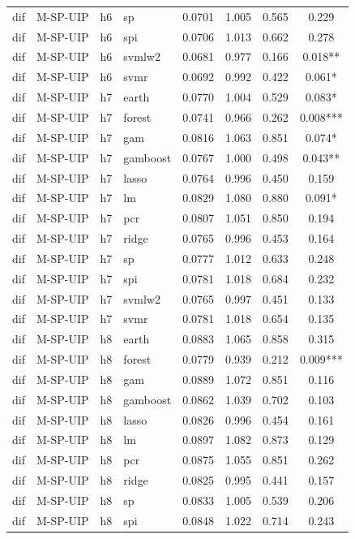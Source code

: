 \begin{ThreePartTable}
\begin{longtable}[t]{llclcccc}
dif & M-SP-UIP & h6 & sp & 0.0701 & 1.005 & 0.565 & 0.229\\
dif & M-SP-UIP & h6 & spi & 0.0706 & 1.013 & 0.662 & 0.278\\
dif & M-SP-UIP & h6 & svmlw2 & 0.0681 & 0.977 & 0.166 & 0.018**\\
dif & M-SP-UIP & h6 & svmr & 0.0692 & 0.992 & 0.422 & 0.061*\\
\addlinespace
dif & M-SP-UIP & h7 & earth & 0.0770 & 1.004 & 0.529 & 0.083*\\
dif & M-SP-UIP & h7 & forest & 0.0741 & 0.966 & 0.262 & 0.008***\\
dif & M-SP-UIP & h7 & gam & 0.0816 & 1.063 & 0.851 & 0.074*\\
dif & M-SP-UIP & h7 & gamboost & 0.0767 & 1.000 & 0.498 & 0.043**\\
dif & M-SP-UIP & h7 & lasso & 0.0764 & 0.996 & 0.450 & 0.159\\
dif & M-SP-UIP & h7 & lm & 0.0829 & 1.080 & 0.880 & 0.091*\\
dif & M-SP-UIP & h7 & pcr & 0.0807 & 1.051 & 0.850 & 0.194\\
dif & M-SP-UIP & h7 & ridge & 0.0765 & 0.996 & 0.453 & 0.164\\
dif & M-SP-UIP & h7 & sp & 0.0777 & 1.012 & 0.633 & 0.248\\
dif & M-SP-UIP & h7 & spi & 0.0781 & 1.018 & 0.684 & 0.232\\
dif & M-SP-UIP & h7 & svmlw2 & 0.0765 & 0.997 & 0.451 & 0.133\\
dif & M-SP-UIP & h7 & svmr & 0.0781 & 1.018 & 0.654 & 0.135\\
\addlinespace
dif & M-SP-UIP & h8 & earth & 0.0883 & 1.065 & 0.858 & 0.315\\
dif & M-SP-UIP & h8 & forest & 0.0779 & 0.939 & 0.212 & 0.009***\\
dif & M-SP-UIP & h8 & gam & 0.0889 & 1.072 & 0.851 & 0.116\\
dif & M-SP-UIP & h8 & gamboost & 0.0862 & 1.039 & 0.702 & 0.103\\
dif & M-SP-UIP & h8 & lasso & 0.0826 & 0.996 & 0.454 & 0.161\\
dif & M-SP-UIP & h8 & lm & 0.0897 & 1.082 & 0.873 & 0.129\\
dif & M-SP-UIP & h8 & pcr & 0.0875 & 1.055 & 0.851 & 0.262\\
dif & M-SP-UIP & h8 & ridge & 0.0825 & 0.995 & 0.441 & 0.157\\
dif & M-SP-UIP & h8 & sp & 0.0833 & 1.005 & 0.539 & 0.206\\
dif & M-SP-UIP & h8 & spi & 0.0848 & 1.022 & 0.714 & 0.243\\

\end{longtable}
\end{ThreePartTable}
